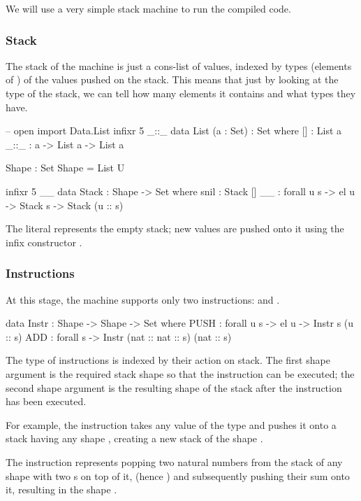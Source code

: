 We will use a very simple stack machine to run the compiled code.

\subsubsection{Stack}

The stack of
the machine is just a cons-list of values, indexed by types (elements of
) of the values pushed on the stack.  This means that just by looking
at the type of the stack, we can tell how many elements it contains and what
types they have.
\begin{code}
  -- open import Data.List
  infixr 5 _::_
  data List (a : Set) : Set where
    [] : List a
    _::_ : a -> List a -> List a

  Shape : Set
  Shape = List U

  infixr 5 _\scons_
  data Stack : Shape -> Set where
    snil : Stack []
    _\scons_ : forall {u s} -> el u -> Stack s -> Stack (u :: s)
\end{code}
\noindent The literal  represents the empty stack; new values are
pushed onto it using the infix constructor \ident{\_\scons\_}.

\subsubsection{Instructions}

At this stage, the machine supports only two instructions: 
and .
\begin{code}
  data Instr : Shape -> Shape -> Set where
    PUSH : forall {u s} -> el u -> Instr s (u :: s)
    ADD : forall s -> Instr (nat :: nat :: s) (nat :: s)
\end{code}
The type of instructions is indexed by their action on stack. The first shape
argument is the required stack shape so that the instruction can be executed;
the second shape argument is the resulting shape of the stack after the
instruction has been executed.

For example, the instruction  takes any value of the type 
and pushes it onto a stack having any shape , creating a new
stack of the shape .

The instruction  represents popping two natural numbers from the
stack of any shape with two s on top of it, (hence
)
and subsequently pushing their sum onto it, resulting in the shape
.

